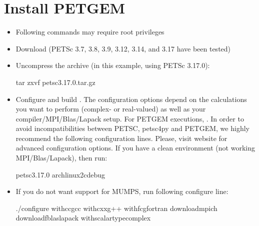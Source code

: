 \documentclass[letterpaper,10pt,english]{sphinxmanual}
\begin{document}
\section{Install PETGEM}
\label{\detokenize{Installation:install-petgem}}\label{\detokenize{Installation:install}}\begin{itemize}
\item {} 
Following commands may require root privileges

\item {} 
Download  (PETSc 3.7, 3.8, 3.9, 3.12, 3.14, and 3.17 have been tested)

\item {} 
Uncompress the  archive (in this example, using PETSc 3.17.0):

\begin{sphinxVerbatim}[commandchars=\\\{\}]
\PYGZdl{} tar zxvf petsc\PYGZhy{}3.17.0.tar.gz
\end{sphinxVerbatim}

\item {} 
Configure and build . The configuration options depend on the calculations you want to perform (complex- or real-valued) as well as your compiler/MPI/Blas/Lapack setup. For PETGEM executions, . In order to avoid incompatibilities between PETSC, petsc4py and PETGEM, we highly recommend the following configuration lines. Please, visit  website for advanced configuration options. If you have a clean environment (not working MPI/Blas/Lapack), then run:

\begin{sphinxVerbatim}[commandchars=\\\{\}]
\PYGZdl{}  petsc\PYGZhy{}3.17.0
\PYGZdl{}  
\PYGZdl{}  arch\PYGZhy{}linux2\PYGZhy{}c\PYGZhy{}debug
\end{sphinxVerbatim}

\item {} 
If you do not want support for MUMPS, run following configure line:

\begin{sphinxVerbatim}[commandchars=\\\{\}]
\PYGZdl{} ./configure \PYGZhy{}\PYGZhy{}with\PYGZhy{}ccgcc \PYGZhy{}\PYGZhy{}with\PYGZhy{}cxxg++ \PYGZhy{}\PYGZhy{}with\PYGZhy{}fcgfortran  \PYGZhy{}\PYGZhy{}download\PYGZhy{}mpich \PYGZhy{}\PYGZhy{}download\PYGZhy{}fblaslapack \PYGZhy{}\PYGZhy{}with\PYGZhy{}scalar\PYGZhy{}typecomplex
\end{sphinxVerbatim}


\end{itemize}
\end{document}

